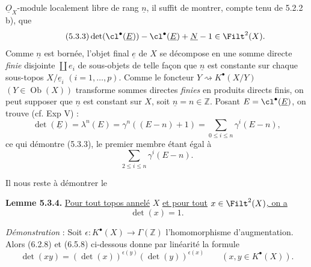 
\(\underline{O}_X\)-module localement libre de rang \(\underline{n}\), il suffit de montrer, compte tenu de 5.2.2 b), que
\begin{equation}\tag{5.3.3}
 \det(\cl^{\bullet}(\underline{E}))-\cl^{\bullet}(\underline{E})+\underline{N}-1\in\Filt^2(X).
\end{equation}
Comme \(\underline{n}\) est bornée, l'objet final \(\underline{e}\) de \(X\) se décompose en une somme directe \emph{finie} disjointe \(\coprod e_i\) de sous-objets de telle façon que \(\underline{n}\) est constante sur chaque sous-topos \(X/\underline{e}_i\) \((i=1,\ldots,p)\). Comme le foncteur \(Y\rightsquigarrow K^{\bullet}(X/Y)\) \((Y\in\operatorname{Ob}(X))\) transforme sommes directes \emph{finies} en produits directs finis, on peut supposer que \(\underline n\) est constant sur \(X\), soit \(\underline n=n\in\mathbb Z\). Posant \(E=\cl^{\bullet}(\underline E)\), on trouve (cf. Exp V) :
\[
 \det(\underline{E})=\lambda^n(E)=\gamma^n((E-n)+1)
 =
 \sum_{0\leq i\leq n}\gamma^i(E-n),
\]
ce qui démontre (5.3.3), le premier membre étant égal à
\[
 \sum_{2\leq i\leq n}\gamma^i(E-n).
\]

Il nous reste à démontrer le

\textbf{Lemme 5.3.4.} \uline{Pour tout topos annelé} \(X\) \uline{et pour tout} \(x\in\Filt^2(X)\)\uline{, on a}
\[
 \det(x)=1.
\]

\emph{Démonstration} : Soit \(\epsilon:K^{\bullet}(X)\to\Gamma(\mathbb Z)\) l'homomorphisme d'augmentation. Alors (6.2.8) et (6.5.8) ci-dessous donne par linéarité la formule
\begin{equation}\tag{5.3.5}
 \det(xy)=(\det(x))^{\epsilon(y)}(\det(y))^{\epsilon(x)}
 \qquad(x,y\in K^{\bullet}(X)).
\end{equation}
